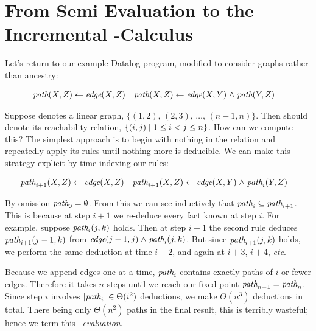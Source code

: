 \section{From Semi\naive{} Evaluation to the Incremental \boldfn-Calculus}
\label{sec:seminaive-and-ilc}

Let's return to our example Datalog program, modified to consider graphs rather
than ancestry:

\begin{align*}
  \name{path}(X,Z) &\gets \name{edge}(X,Z)
  &
  \name{path}(X,Z) &\gets \name{edge}(X,Y) \wedge \name{path}(Y,Z)
\end{align*}


\noindent
Suppose  denotes a linear graph, $\{(1, 2),\, (2, 3),\, \dots,\,
({n-1}, n)\}$. Then  should denote its reachability relation,
$\{(i, j) \mathrel{|} 1 \le i < j \le n\}$. How can we compute this? The simplest
approach is to begin with nothing in the  relation and repeatedly
apply its rules until nothing more is deducible. We can make this strategy
explicit by time-indexing our rules:

\begin{align*}
  \name{path}_{i+1}(X,Z) &\gets \name{edge}(X,Z)
  &
  \name{path}_{i+1}(X,Z) &\gets \name{edge}(X,Y) \wedge \name{path}_i(Y,Z)
\end{align*}

\noindent
By omission $\text{\itshape path}_0 = \emptyset$. From this we can see inductively that
$\text{\itshape path}_i \subseteq \text{\itshape path}_{i+1}$.
%
This is because at step $i+1$ we re-deduce every fact known at step $i$.
%
For example, suppose $\text{\itshape path}_i(j, k)$ holds. Then at step $i+1$ the second
rule deduces $\text{\itshape path}_{i+1}({j-1}, k)$ from $\name{edge}({j-1}, j) \wedge
\name{path}_i(j,k)$.
%
But since $\text{\itshape path}_{i+1}(j, k)$ holds, we perform the same deduction at time
$i+2$, and again at $i+3$, $i+4$, \emph{etc}.

Because we append edges one at a time, $\text{\itshape path}_i$ contains exactly paths of
$i$ or fewer edges.
%
Therefore it takes $n$ steps until we reach our fixed point $\text{\itshape path}_{n-1} =
\text{\itshape path}_n$.
%
Since step $i$ involves $|\text{\itshape path}_i| \in \Theta(i^2)$ deductions, we make
$\Theta(n^3)$ deductions in total.
%
There being only $\Theta(n^2)$ paths in the final result, this is terribly
wasteful; hence we term this \emph{\naive\ evaluation}.

